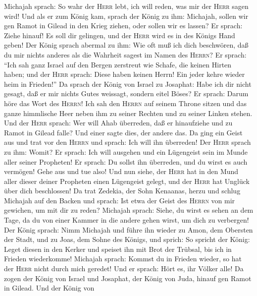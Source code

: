 Michajah sprach: So wahr der \textsc{Herr} lebt, ich will reden, was mir
der \textsc{Herr} sagen wird!  Und als er zum König kam,
sprach der König zu ihm: Michajah, sollen wir gen Ramot in Gilead in den
Krieg ziehen, oder sollen wir es lassen? Er sprach: Ziehe hinauf! Es
soll dir gelingen, und der \textsc{Herr} wird es in des Königs Hand
geben!  Der König sprach abermal zu ihm: Wie oft muß ich
dich beschwören, daß du mir nichts anderes als die Wahrheit sagest im
Namen des \textsc{Herrn}?  Er sprach: ``Ich sah ganz
Israel auf den Bergen zerstreut wie Schafe, die keinen Hirten haben; und
der \textsc{Herr} sprach: Diese haben keinen Herrn! Ein jeder kehre
wieder heim in Frieden!''  Da sprach der König von Israel
zu Josaphat: Habe ich dir nicht gesagt, daß er mir nichts Gutes
weissagt, sondern eitel Böses?  Er sprach: Darum höre das
Wort des \textsc{Herrn}! Ich sah den \textsc{Herrn} auf seinem Throne
sitzen und das ganze himmlische Heer neben ihm zu seiner Rechten und zu
seiner Linken stehen.  Und der \textsc{Herr} sprach: Wer
will Ahab überreden, daß er hinaufziehe und zu Ramot in Gilead falle?
Und einer sagte dies, der andere das.  Da ging ein Geist
aus und trat vor den \textsc{Herrn} und sprach: Ich will ihn überreden!
Der \textsc{Herr} sprach zu ihm: Womit?  Er sprach: Ich
will ausgehen und ein Lügengeist sein im Munde aller seiner Propheten!
Er sprach: Du sollst ihn überreden, und du wirst es auch vermögen! Gehe
aus und tue also!  Und nun siehe, der \textsc{Herr} hat
in den Mund aller dieser deiner Propheten einen Lügengeist gelegt, und
der \textsc{Herr} hat Unglück über dich beschlossen!  Da
trat Zedekia, der Sohn Kenaanas, herzu und schlug Michajah auf den
Backen und sprach: Ist etwa der Geist des \textsc{Herrn} von mir
gewichen, um mit dir zu reden?  Michajah sprach: Siehe,
du wirst es sehen an dem Tage, da du von einer Kammer in die andere
gehen wirst, um dich zu verbergen!  Der König sprach:
Nimm Michajah und führe ihn wieder zu Amon, dem Obersten der Stadt, und
zu Joas, dem Sohne des Königs, und sprich:  So spricht
der König: Leget diesen in den Kerker und speiset ihn mit Brot der
Trübsal, bis ich in Frieden wiederkomme!  Michajah
sprach: Kommst du in Frieden wieder, so hat der \textsc{Herr} nicht
durch mich geredet! Und er sprach: Hört es, ihr Völker alle!
 Da zogen der König von Israel und Josaphat, der König
von Juda, hinauf gen Ramot in Gilead.  Und der König von
